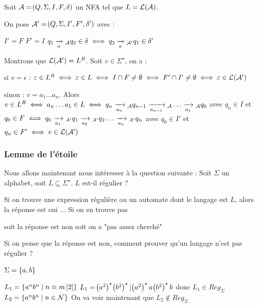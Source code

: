 \documentclass[a4paper,french,bookmarks]{book}
\begin{document}
    \begin{nproof}
        Soit $\mathcal{A} = \!\left(Q, \Sigma, I, F, \delta\right)$ un NFA tel que $L = \mathcal{L}\!\left(\mathcal{A}\right)$.
        
        On pose $\mathcal{A}' = \!\left(Q, \Sigma, I', F', \delta'\right)$ avec :
        \begin{enumerate}
            \itt $I' = F$
            \itt $F' = I$
            \itt $q_1 \lima{a}{}_\bcA q_2 \in \delta \iff q_2 \lima{a}{}_{\bcA'} q_1 \in \delta'$
        \end{enumerate}
        Montrons que $\mathcal{L}\!\left(\mathcal{A}'\right) = L^R$. Soit $v \in \Sigma^\star$, on a :
        \begin{enumerate}
            \itt si $v = \epsilon$ : $\varepsilon \in L^R \iff \varepsilon \in L \iff I \cap F \neq \emptyset \iff F' \cap I' \neq \emptyset \iff \varepsilon \in \mathcal{L}\!\left(\mathcal{A}'\right)$
            
            \itt sinon : $v = a_1 \dots a_n$.
            Alors $v \in L^R \iff a_n \dots a_1 \in L \iff q_n \lima{a_{n}}{}_\bcA q_{n-1} \lima{a_{n-1}}{}_\bcA \dots \lima{a_1}{}_\bcA q_0$ avec $q_n \in I$ et $q_0 \in F \iff q_0 \lima{a_1}{}_{A'} q_1 \lima{a_2}{}_{A'} q_2 \dots \lima{a_n}{}_{A'} q_n$ avec $q_0 \in I'$ et $q_n \in F' \iff v \in \mathcal{L}\!\left(\mathcal{A}'\right)$
        \end{enumerate}
    \end{nproof}
    
    \subsubsection{Lemme de l'étoile}
    
    Nous allons maintenant nous intéresser à la question suivante :
    Soit $\Sigma$ un alphabet, soit $L \subseteq \Sigma^\star$. $L$ est-il régulier ?
    \begin{enumerate}
        \itt Si on trouve une expression régulière ou un automate dont le langage est $L$, alors la réponse est oui $\dots$
        \itt Si on en trouve pas
        \begin{enumerate}
            \itt soit la réponse est non
            \itt soit on a "pas assez cherché"
        \end{enumerate}
    \end{enumerate}
    Si on pense que la réponse est non, comment prouver qu'un langage n'est pas régulier ?
    
    \begin{example}{}{}
        $\Sigma = \left\{a, b\right\}$
        \begin{enumerate}
            \itt $L_1 = \left\{a^n b^n\;\middle\vert\; n \equiv m \left[2\right]\right\}$
            $L_1 = \!\left(a^2\right)^\star \!\left(b^2\right)^\star \vert \!\left(a^2\right)^\star a \!\left(b^2\right)^\star b$
            donc $L_1 \in Reg_\Sigma$
            \itt $L_2 = \left\{a^n b^n \;\middle\vert\; n \in \mathcal{N}\right\}$
            On va voir maintenant que $L_2 \notin Reg_\Sigma$
        \end{enumerate}
    \end{example}
    
\end{document}
